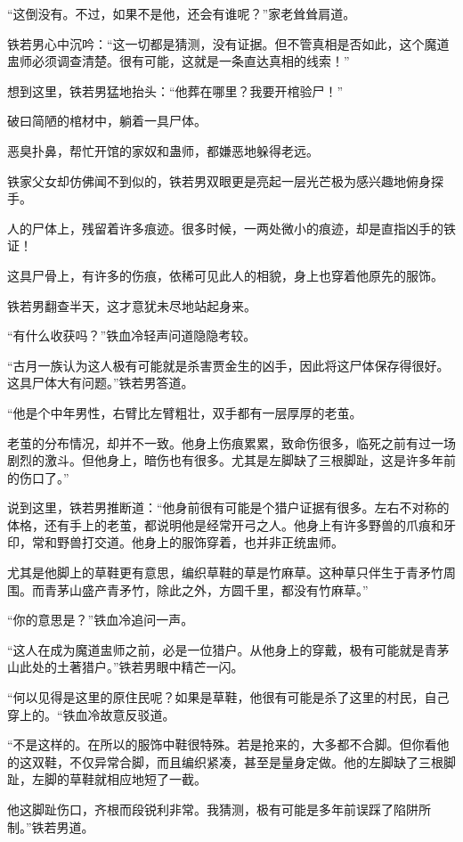 \begin{this_body}
“这倒没有。不过，如果不是他，还会有谁呢？”家老耸耸肩道。

铁若男心中沉吟：“这一切都是猜测，没有证据。但不管真相是否如此，这个魔道盅师必须调查清楚。很有可能，这就是一条直达真相的线索！”

想到这里，铁若男猛地抬头：“他葬在哪里？我要开棺验尸！”

破曰简陋的棺材中，躺着一具尸体。

恶臭扑鼻，帮忙开馆的家奴和蛊师，都嫌恶地躲得老远。

铁家父女却仿佛闻不到似的，铁若男双眼更是亮起一层光芒极为感兴趣地俯身探手。

人的尸体上，残留着许多痕迹。很多时候，一两处微小的痕迹，却是直指凶手的铁证！

这具尸骨上，有许多的伤痕，依稀可见此人的相貌，身上也穿着他原先的服饰。

铁若男翻查半天，这才意犹未尽地站起身来。

“有什么收获吗？”铁血冷轻声问道隐隐考较。

“古月一族认为这人极有可能就是杀害贾金生的凶手，因此将这尸体保存得很好。这具尸体大有问题。”铁若男答道。

“他是个中年男性，右臂比左臂粗壮，双手都有一层厚厚的老茧。

老茧的分布情况，却并不一致。他身上伤痕累累，致命伤很多，临死之前有过一场剧烈的激斗。但他身上，暗伤也有很多。尤其是左脚缺了三根脚趾，这是许多年前的伤口了。”

说到这里，铁若男推断道：“他身前很有可能是个猎户证据有很多。左右不对称的体格，还有手上的老茧，都说明他是经常开弓之人。他身上有许多野兽的爪痕和牙印，常和野兽打交道。他身上的服饰穿着，也并非正统盅师。

尤其是他脚上的草鞋更有意思，编织草鞋的草是竹麻草。这种草只伴生于青矛竹周围。而青茅山盛产青矛竹，除此之外，方圆千里，都没有竹麻草。”

“你的意思是？”铁血冷追问一声。

“这人在成为魔道盅师之前，必是一位猎户。从他身上的穿戴，极有可能就是青茅山此处的土著猎户。”铁若男眼中精芒一闪。

“何以见得是这里的原住民呢？如果是草鞋，他很有可能是杀了这里的村民，自己穿上的。“铁血冷故意反驳道。

“不是这样的。在所以的服饰中鞋很特殊。若是抢来的，大多都不合脚。但你看他的这双鞋，不仅异常合脚，而且编织紧凑，甚至是量身定做。他的左脚缺了三根脚趾，左脚的草鞋就相应地短了一截。

他这脚趾伤口，齐根而段锐利非常。我猜测，极有可能是多年前误踩了陷阱所制。”铁若男道。


\end{this_body}
